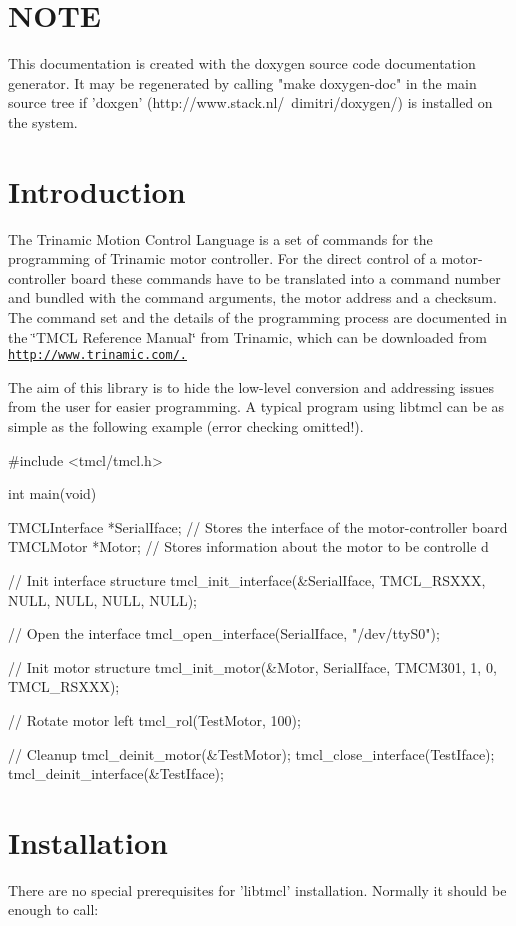 \hypertarget{index_NOTE}{}\section{NOTE}\label{index_NOTE}
\begin{DoxyVerb}
  This documentation is created with the doxygen source code documentation generator.
  It may be regenerated by calling "make doxygen-doc" in the main source tree if
  'doxgen' (http://www.stack.nl/~dimitri/doxygen/) is installed on the system.
 \end{DoxyVerb}
\hypertarget{index_intro_sec}{}\section{Introduction}\label{index_intro_sec}
The Trinamic Motion Control Language is a set of commands for the programming of Trinamic motor controller. For the direct control of a motor-\/controller board these commands have to be translated into a command number and bundled with the command arguments, the motor address and a checksum. The command set and the details of the programming process are documented in the \char`\"{}TMCL Reference
 Manual\char`\"{} from Trinamic, which can be downloaded from \href{http://www.trinamic.com/.}{\tt http://www.trinamic.com/.}

The aim of this library is to hide the low-\/level conversion and addressing issues from the user for easier programming. A typical program using libtmcl can be as simple as the following example (error checking omitted!).


\begin{DoxyCode}
 #include <tmcl/tmcl.h>

 int main(void) {

      TMCLInterface *SerialIface; // Stores the interface of the motor-controller
       board
      TMCLMotor *Motor;     // Stores information about the motor to be controlle
      d

      // Init interface structure
      tmcl_init_interface(&SerialIface, TMCL_RSXXX, NULL, NULL, NULL, NULL);

      // Open the interface
      tmcl_open_interface(SerialIface, "/dev/ttyS0");

      // Init motor structure
      tmcl_init_motor(&Motor, SerialIface, TMCM301, 1, 0, TMCL_RSXXX);

      // Rotate motor left
      tmcl_rol(TestMotor, 100);

      // Cleanup
      tmcl_deinit_motor(&TestMotor);
      tmcl_close_interface(TestIface);
      tmcl_deinit_interface(&TestIface);

 }
\end{DoxyCode}
\hypertarget{index_install_sec}{}\section{Installation}\label{index_install_sec}
There are no special prerequisites for 'libtmcl' installation. Normally it should be enough to call:


